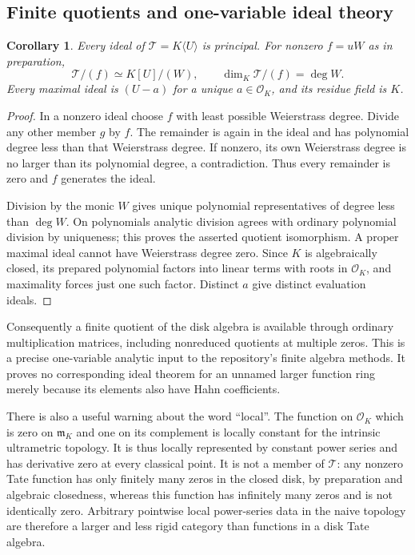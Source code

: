 \documentclass[11pt,a4paper]{article}
\numberwithin{equation}{section}
\newtheorem{corollary}[theorem]{Corollary}
\theoremstyle{definition}
\theoremstyle{remark}
\newcommand{\OO}{\mathcal O}
\newcommand{\mm}{\mathfrak m}
\newcommand{\TT}{\mathcal T}
\begin{document}
\subsection{Finite quotients and one-variable ideal theory}
\begin{corollary}\label{cor:finitequotient}
Every ideal of $\TT=K\langle U\rangle$ is principal. For nonzero $f=uW$ as
in preparation,
\[
 \TT/(f)\simeq K[U]/(W),\qquad
 \dim_K\TT/(f)=\deg W.
\]
Every maximal ideal is $(U-a)$ for a unique $a\in\OO_K$, and its residue
field is $K$.
\end{corollary}
\begin{proof}
In a nonzero ideal choose $f$ with least possible Weierstrass degree. Divide
any other member $g$ by $f$. The remainder is again in the ideal and has
polynomial degree less than that Weierstrass degree. If nonzero, its own
Weierstrass degree is no larger than its polynomial degree, a contradiction.
Thus every remainder is zero and $f$ generates the ideal.

Division by the monic $W$ gives unique polynomial representatives of degree
less than $\deg W$. On polynomials analytic division agrees with ordinary
polynomial division by uniqueness; this proves the asserted quotient
isomorphism. A proper maximal ideal cannot have Weierstrass degree zero.
Since $K$ is algebraically closed, its prepared polynomial factors into linear
terms with roots in $\OO_K$, and maximality forces just one such factor.
Distinct $a$ give distinct evaluation ideals.
\end{proof}

Consequently a finite quotient of the disk algebra is available through
ordinary multiplication matrices, including nonreduced quotients at multiple
zeros. This is a precise one-variable analytic input to the repository's finite
algebra methods. It proves no corresponding ideal theorem for an unnamed
larger function ring merely because its elements also have Hahn coefficients.

There is also a useful warning about the word ``local''. The function on
$\OO_K$ which is zero on $\mm_K$ and one on its complement is locally constant
for the intrinsic ultrametric topology. It is thus locally represented by
constant power series and has derivative zero at every classical point. It is
not a member of $\TT$: any nonzero Tate function has only finitely many zeros
in the closed disk, by preparation and algebraic closedness, whereas this
function has infinitely many zeros and is not identically zero. Arbitrary
pointwise local power-series data in the naive topology are therefore a
larger and less rigid category than functions in a disk Tate algebra.
\end{document}
